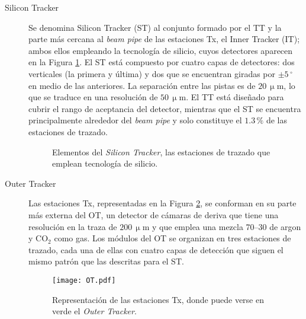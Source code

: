 \begin{description}

	\item[Silicon Tracker] \color{vero} Se denomina Silicon Tracker (ST) al conjunto formado por el TT y la parte más cercana al \emph{beam pipe} de las estaciones Tx, el Inner Tracker (IT); ambos ellos empleando la tecnología de silicio, cuyos detectores aparecen en la Figura \ref{fig_sillicontracker1}. \color{norm}
	El ST está compuesto por cuatro capas de detectores: dos verticales (la primera y última) y dos que se encuentran giradas por $\pm 5\,{}^{\circ}$ en medio de las anteriores. La separación entre las pistas es de $20\, \mathrm{\upmu m}$, lo que se traduce \color{vero} en \color{norm} una resolución de $50\,\mathrm{\upmu m}$. El TT está diseñado para cubrir el rango de aceptancia del detector, mientras que el ST se encuentra principalmente alrededor del \emph{beam pipe} y solo constituye el $1.3 \, \%$ de las estaciones de trazado.
\begin{figure}[H]
\centering
{} \hfill 
{} \hfill
\caption{Elementos del \emph{Silicon Tracker}, las estaciones de trazado que emplean tecnología de silicio.} \label{fig_sillicontracker1}
\end{figure}

	\item[Outer Tracker]  Las \color{vero}estaciones Tx, representadas en la Figura \ref{fig_sillicontracker2}, \color{norm} se conforman en su parte más externa del OT, un detector de cámaras de deriva que tiene una resolución en la traza de $200\, \mathrm{\upmu m}$ y que emplea una mezcla 70--30 de argon y $\mathrm{CO_2}$ como gas. Los módulos del OT se organizan en tres estaciones de trazado, cada una de ellas con cuatro capas de detección que siguen el mismo patrón que las descritas para el ST.
\begin{figure}[H]
\centering
\texttt{[image: OT.pdf]}
\caption{Representación de las estaciones Tx, donde puede verse en verde el \emph{Outer Tracker}.} \label{fig_sillicontracker2}
\end{figure}

\end{description} 



